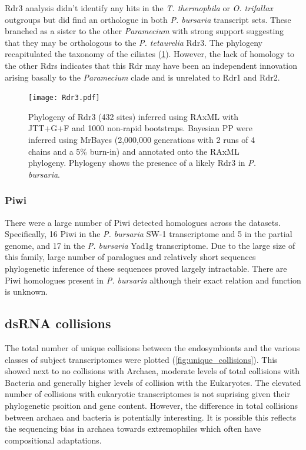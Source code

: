 Rdr3 analysis didn't identify any hits in the \textit{T. thermophila}
or \textit{O. trifallax} outgroups but did find an orthologue
in both \textit{P. bursaria} transcript sets.  These branched
as a sister to the other \textit{Paramecium} with strong support
suggesting that they may be orthologous to the \textit{P. tetaurelia}
Rdr3. The phylogeny recapitulated the taxonomy of the ciliates (\cref{fig:rdr3_phylo}).
However, the lack of homology to the other Rdrs indicates that
this Rdr may have been an independent innovation arising basally to the \textit{Paramecium}
clade and is unrelated to Rdr1 and Rdr2.

\begin{figure}
    \texttt{[image: Rdr3.pdf]}
    \caption[Rdr3 Phylogeny]{Phylogeny of Rdr3 (432 sites)
        inferred using RAxML with JTT+G+F and 1000 non-rapid
        bootstraps. Bayesian PP were inferred using MrBayes
        (2,000,000 generations with 2 runs of 4 chains and a 5\% burn-in)
        and annotated onto the RAxML phylogeny.  Phylogeny
        shows the presence of a likely Rdr3 in \textit{P. bursaria}.}
    \label{fig:rdr3_phylo}
\end{figure}

\subsubsection{Piwi}

There were a large number of Piwi detected homologues across
the datasets. Specifically, 16 Piwi in the \textit{P. bursaria} SW-1
transcriptome and 5 in the partial genome, and 17 in the \textit{P. 
bursaria} Yad1g transcriptome.
Due to the large size of this family, large number of paralogues
and relatively short sequences phylogenetic inference
of these sequences proved largely intractable. There are Piwi
homologues present in \textit{P. bursaria} although their exact
relation and function is unknown.


\subsection{dsRNA collisions}

The total number of unique collisions between the endosymbionts and 
the various classes of subject transcriptomes were plotted
(\cref{fig:unique_collisions}). 
This showed next to no collisions with Archaea, moderate levels of total
collisions with Bacteria and generally higher levels of collision
with the Eukaryotes.  The elevated number of collisions with eukaryotic
transcriptomes is not suprising given their 
phylogenetic psoition and gene content.  However, the difference in total 
collisions between archaea and bacteria is potentially interesting. 
It is possible this reflects the sequencing bias in archaea
towards extremophiles which often have compositional adaptations.


